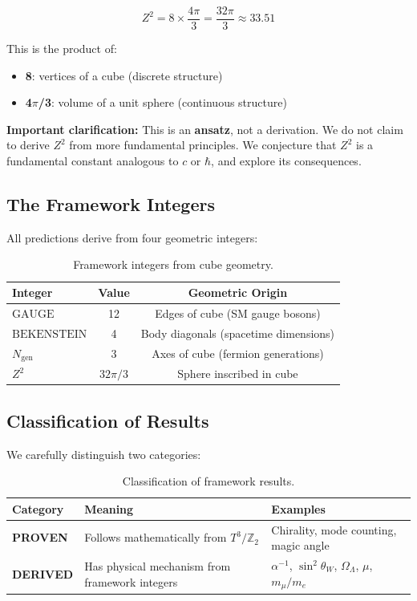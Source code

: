 \documentclass[12pt,a4paper]{article}
\newcommand{\Ztwo}{\mathbb{Z}_2}
\newcommand{\Tthree}{T^3}
\newcommand{\OmegaL}{\Omega_\Lambda}
\newcommand{\sinW}{\sin^2\theta_W}
\newcommand{\Zsq}{Z^2}
\newcommand{\GAUGE}{\text{GAUGE}}
\newcommand{\BEKENSTEIN}{\text{BEKENSTEIN}}
\newcommand{\Ngen}{N_{\text{gen}}}
\begin{document}
\begin{equation}
\boxed{\Zsq = 8 \times \frac{4\pi}{3} = \frac{32\pi}{3} \approx 33.51}
\end{equation}

This is the product of:
\begin{itemize}
    \item \textbf{8}: vertices of a cube (discrete structure)
    \item \textbf{4$\pi$/3}: volume of a unit sphere (continuous structure)
\end{itemize}

\textbf{Important clarification:} This is an \textbf{ansatz}, not a derivation. We do not claim to derive $\Zsq$ from more fundamental principles. We conjecture that $\Zsq$ is a fundamental constant analogous to $c$ or $\hbar$, and explore its consequences.

\subsection{The Framework Integers}

All predictions derive from four geometric integers:

\begin{table}[H]
\centering
\begin{tabular}{lcc}
\toprule
\textbf{Integer} & \textbf{Value} & \textbf{Geometric Origin} \\
\midrule
$\GAUGE$ & 12 & Edges of cube (SM gauge bosons) \\
$\BEKENSTEIN$ & 4 & Body diagonals (spacetime dimensions) \\
$\Ngen$ & 3 & Axes of cube (fermion generations) \\
$\Zsq$ & $32\pi/3$ & Sphere inscribed in cube \\
\bottomrule
\end{tabular}
\caption{Framework integers from cube geometry.}
\label{tab:integers}
\end{table}

\subsection{Classification of Results}

We carefully distinguish two categories:

\begin{table}[H]
\centering
\begin{tabular}{lll}
\toprule
\textbf{Category} & \textbf{Meaning} & \textbf{Examples} \\
\midrule
\textbf{PROVEN} & Follows mathematically from $\Tthree/\Ztwo$ & Chirality, mode counting, magic angle \\
\textbf{DERIVED} & Has physical mechanism from framework integers & $\alpha^{-1}$, $\sinW$, $\OmegaL$, $\mu$, $m_\mu/m_e$ \\
\bottomrule
\end{tabular}
\caption{Classification of framework results.}
\end{table}
\end{document}
